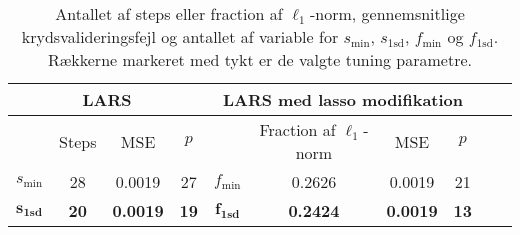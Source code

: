 \begin{table}
\center
\begin{tabular}{cccc | cccccc}
\toprule
   \multicolumn{4}{c}{LARS} &  \multicolumn{4}{c}{LARS med lasso modifikation}  \\ \midrule
 & Steps & MSE & $p$ & & Fraction af \(\ell_1\)-norm & MSE & $p$ \\
 $s_{\min}$ &28 & 0.0019 &27  &	$f_{\min}$ & 0.2626 & 0.0019 & 21\\ 
 $\mathbf{s}_{\textbf{1sd}}$ & \textbf{20}& \textbf{0.0019} & \textbf{19} & $\mathbf{f}_{\textbf{1sd}}$& \textbf{0.2424} & \textbf{0.0019} & \textbf{13 } \\ \bottomrule 
 \end{tabular}
\caption{Antallet af steps eller fraction af \(\ell_1\)-norm, gennemsnitlige krydsvalideringsfejl og antallet af variable for $s_{\min}$, $s_{\text{1sd}}$, $f_{\min}$ og $f_{\text{1sd}}$.
Rækkerne markeret med tykt er de valgte tuning parametre.} \label{tab:lars_lasso_tab}
\end{table}
